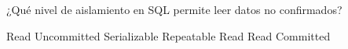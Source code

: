 \question[1] ¿Qué nivel de aislamiento en SQL permite leer datos no confirmados?
\begin{choices}
\CorrectChoice Read Uncommitted
\choice Serializable
\choice Repeatable Read
\choice Read Committed
\end{choices}